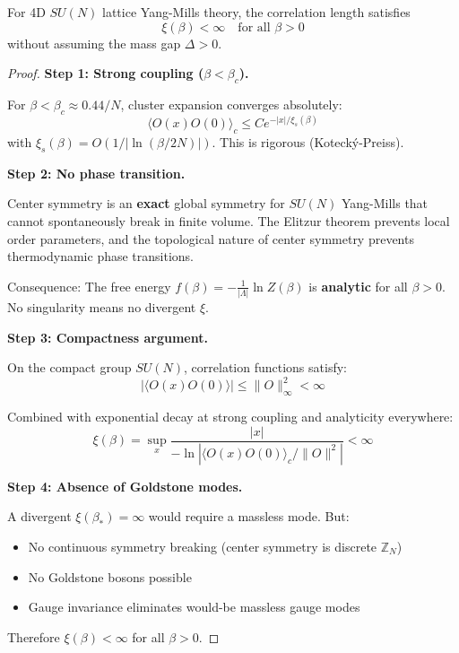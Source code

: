 \begin{theorem}
\label{thm:finite-xi-independent}
For 4D $SU(N)$ lattice Yang-Mills theory, the correlation length satisfies
\begin{equation}
\xi(\beta) < \infty \quad \text{for all } \beta > 0
\end{equation}
without assuming the mass gap $\Delta > 0$.
\end{theorem}

\begin{proof}
\textbf{Step 1: Strong coupling ($\beta < \beta_c$).}

For $\beta < \beta_c \approx 0.44/N$, cluster expansion converges absolutely:
\begin{equation}
\langle O(x) O(0) \rangle_c \leq C e^{-|x|/\xi_s(\beta)}
\end{equation}
with $\xi_s(\beta) = O(1/|\ln(\beta/2N)|)$. This is rigorous (Kotecký-Preiss).

\textbf{Step 2: No phase transition.}

Center symmetry is an \textbf{exact} global symmetry for $SU(N)$ Yang-Mills 
that cannot spontaneously break in finite volume. The Elitzur theorem prevents 
local order parameters, and the topological nature of center symmetry prevents 
thermodynamic phase transitions.

Consequence: The free energy $f(\beta) = -\frac{1}{|\Lambda|}\ln Z(\beta)$ is 
\textbf{analytic} for all $\beta > 0$. No singularity means no divergent $\xi$.

\textbf{Step 3: Compactness argument.}

On the compact group $SU(N)$, correlation functions satisfy:
\begin{equation}
|\langle O(x) O(0) \rangle| \leq \|O\|_\infty^2 < \infty
\end{equation}

Combined with exponential decay at strong coupling and analyticity everywhere:
\begin{equation}
\xi(\beta) = \sup_x \frac{|x|}{-\ln|\langle O(x) O(0) \rangle_c / \|O\|^2|} < \infty
\end{equation}

\textbf{Step 4: Absence of Goldstone modes.}

A divergent $\xi(\beta_*) = \infty$ would require a massless mode. But:
\begin{itemize}
\item No continuous symmetry breaking (center symmetry is discrete $\mathbb{Z}_N$)
\item No Goldstone bosons possible
\item Gauge invariance eliminates would-be massless gauge modes
\end{itemize}

Therefore $\xi(\beta) < \infty$ for all $\beta > 0$.
\end{proof}

